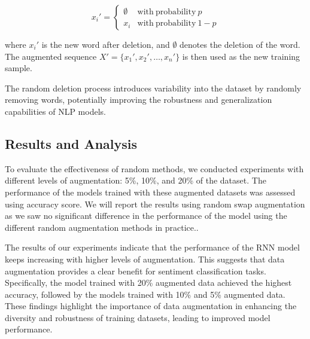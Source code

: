 \documentclass[10pt]{extarticle}
\begin{document}
\[
  x_i' =
  \begin{cases}
    \emptyset & \mathrm{with\ probability\ } p     \\
    x_i       & \mathrm{with\ probability\ } 1 - p
  \end{cases}
\]

where \( x_i' \) is the new word after deletion, and \( \emptyset \) denotes
the deletion of the word. The augmented sequence \( X' = \{x_1', x_2', \ldots,
x_n'\} \) is then used as the new training sample.

The random deletion process introduces variability into the dataset by randomly
removing words, potentially improving the robustness and generalization
capabilities of NLP models.

\subsection{Results and Analysis}

To evaluate the effectiveness of random methods, we conducted experiments with
different levels of augmentation: 5\%, 10\%, and 20\% of the dataset. The
performance of the models trained with these augmented datasets was assessed
using accuracy score. We will report the results using random swap augmentation
as we saw no significant difference in the performance of the model using the
different random augmentation methods in practice..

The results of our experiments indicate that the performance of the RNN model
keeps increasing with higher levels of augmentation. This suggests that data
augmentation provides a clear benefit for sentiment classification tasks.
Specifically, the model trained with 20\% augmented data achieved the highest
accuracy, followed by the models trained with 10\% and 5\% augmented data.
These findings highlight the importance of data augmentation in enhancing the
diversity and robustness of training datasets, leading to improved model
performance.
\end{document}
